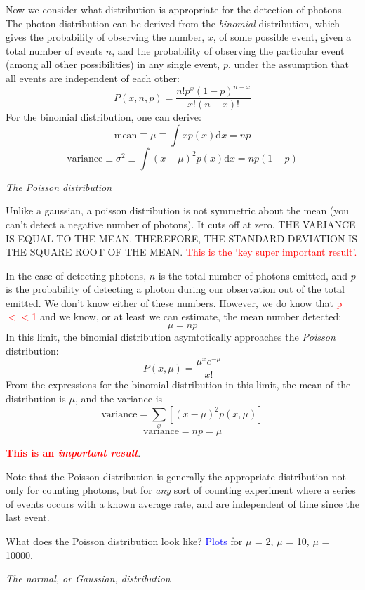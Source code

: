 \documentclass[12pt]{article}
\begin{document}
Now we consider what distribution is appropriate for the
detection of photons. The photon distribution can be derived from the
\emph{binomial} distribution, which gives the probability of observing the
number, $x$, of some possible event, given a total number of events $n$,
and the probability of observing the particular event (among all other
possibilities) in any single event, $p$, under the assumption that all
events are independent of each other:
   $$ P(x,n,p) = \frac{n!p^x(1-p)^{n-x}}{x!(n-x)!}  $$
For the binomial distribution, one can derive:
   $$ \textrm{mean} \equiv \mu \equiv \int xp(x)\textrm{d}x = np $$
   $$ \textrm{variance} \equiv \sigma^2 \equiv
      \int (x-\mu)^2p(x)\textrm{d}x = np(1-p) $$

\emph{The Poisson distribution}

\textcolor{myBlue}{Unlike a gaussian, a poisson distribution is not
symmetric about the mean (you can't detect a negative number of
photons). It cuts off at zero. THE VARIANCE IS EQUAL TO THE MEAN.
THEREFORE, THE STANDARD DEVIATION IS THE SQUARE ROOT OF THE MEAN.}
\textcolor{red}{This is the `key super important result'.}

In the case of detecting photons, $n$ is the total number of
photons emitted, and $p$ is the probability of detecting a photon during
our observation out of the total emitted. We don't know either of
these numbers. However, we do know that
\textcolor{red}{p$<<$1} and we know, or at
least we can estimate, the mean number detected:
  $$  \mu = np $$
In this limit, the binomial distribution asymtotically approaches the
\emph{Poisson} distribution:
   $$  P(x,\mu) = \frac{\mu^x e^{-\mu}}{x!} $$
From the expressions for the binomial distribution in this limit, the
mean of the distribution is $\mu$, and the variance is
  $$  \textrm{variance} = \sum_x [(x-\mu)^2p(x,\mu)] $$
  $$  \textrm{variance} = np = \mu  $$

\textcolor{red}{\textbf{This is an \emph{important result}}}.

Note that the Poisson distribution is generally the
appropriate distribution not only for counting photons, but for
\emph{any} sort of counting experiment where a series of events
occurs with a known average rate, and are independent of time
since the last event.

What does the Poisson distribution look like?
\href{http://astronomy.nmsu.edu/holtz/a535/html/diagrams/a535/poisson.htm}
{\textcolor{blue}{Plots}}
for $\mu$ = 2, $\mu$ = 10, $\mu$ = 10000.

\emph{The normal, or Gaussian, distribution}
\end{document}
